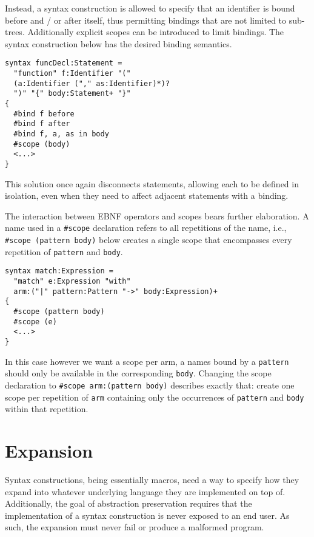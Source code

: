 \documentclass{kththesis}
\begin{document}
Instead, a syntax construction is allowed to specify that an identifier is bound before and / or after itself, thus permitting bindings that are not limited to sub-trees. Additionally explicit scopes can be introduced to limit bindings. The syntax construction below has the desired binding semantics.

\begin{verbatim}
syntax funcDecl:Statement =
  "function" f:Identifier "("
  (a:Identifier ("," as:Identifier)*)?
  ")" "{" body:Statement+ "}"
{
  #bind f before
  #bind f after
  #bind f, a, as in body
  #scope (body)
  <...>
}
\end{verbatim}

This solution once again disconnects statements, allowing each to be defined in isolation, even when they need to affect adjacent statements with a binding.

The interaction between EBNF operators and scopes bears further elaboration. A name used in a \texttt{#scope} declaration refers to all repetitions of the name, i.e., \texttt{#scope (pattern body)} below creates a single scope that encompasses every repetition of \texttt{pattern} and \texttt{body}.

\begin{verbatim}
syntax match:Expression =
  "match" e:Expression "with"
  arm:("|" pattern:Pattern "->" body:Expression)+
{
  #scope (pattern body)
  #scope (e)
  <...>
}
\end{verbatim}

In this case however we want a scope per arm, a names bound by a \texttt{pattern} should only be available in the corresponding \texttt{body}. Changing the scope declaration to \texttt{#scope arm:(pattern body)} describes exactly that: create one scope per repetition of \texttt{arm} containing only the occurrences of \texttt{pattern} and \texttt{body} within that repetition.

\section{Expansion} \label{sec:design-implementation}

Syntax constructions, being essentially macros, need a way to specify how they expand into whatever underlying language they are implemented on top of. Additionally, the goal of abstraction preservation requires that the implementation of a syntax construction is never exposed to an end user. As such, the expansion must never fail or produce a malformed program.
\end{document}
